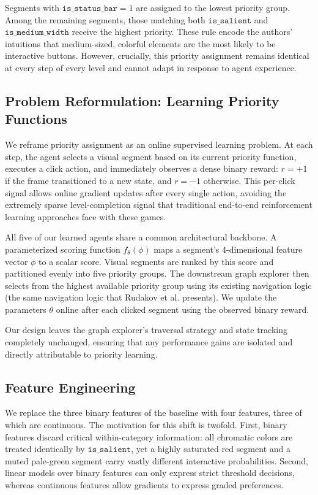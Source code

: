 \documentclass{article}
\begin{document}
Segments with $\texttt{is\_status\_bar} = 1$ are assigned to the lowest priority group. Among the remaining segments, those matching both $\texttt{is\_salient}$ and $\texttt{is\_medium\_width}$ receive the highest priority. These rule encode the authors' intuitions that medium-sized, colorful elements are the most likely to be interactive buttons. However, crucially, this priority assignment remains identical at every step of every level and cannot adapt in response to agent experience.

\subsection{Problem Reformulation: Learning Priority Functions}

We reframe priority assignment as an online supervised learning problem. At each step, the agent selects a visual segment based on its current priority function, executes a click action, and immediately observes a dense binary reward: $r = +1$ if the frame transitioned to a new state, and $r = -1$ otherwise. This per-click signal allows online gradient updates after every single action, avoiding the extremely sparse level-completion signal that traditional end-to-end reinforcement learning approaches face with these games.

All five of our learned agents share a common architectural backbone. A parameterized scoring function $f_\theta(\phi)$ maps a segment's 4-dimensional feature vector $\phi$ to a scalar score. Visual segments are ranked by this score and partitioned evenly into five priority groups. The downstream graph explorer then selects from the highest available priority group using its existing navigation logic (the same navigation logic that Rudakov et al. presents). We update the parameters $\theta$ online after each clicked segment using the observed binary reward. 

Our design leaves the graph explorer's traversal strategy and state tracking completely unchanged, ensuring that any performance gains are isolated and directly attributable to priority learning.

\subsection{Feature Engineering}

We replace the three binary features of the baseline with four features, three of which are continuous. The motivation for this shift is twofold. First, binary features discard critical within-category information: all chromatic colors are treated identically by $\texttt{is\_salient}$, yet a highly saturated red segment and a muted pale-green segment carry vastly different interactive probabilities. Second, linear models over binary features can only express strict threshold decisions, whereas continuous features allow gradients to express graded preferences.
\end{document}
